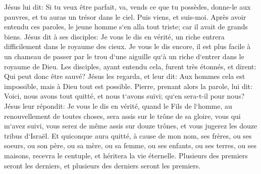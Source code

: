 \verse Jésus lui dit: Si tu veux être parfait, va, vends ce que tu possèdes, donne-le aux pauvres, et tu auras un trésor dans le ciel. Puis viens, et suis-moi. 
\verse Après avoir entendu ces paroles, le jeune homme s`en alla tout triste; car il avait de grands biens. 
\verse Jésus dit à ses disciples: Je vous le dis en vérité, un riche entrera difficilement dans le royaume des cieux. 
\verse Je vous le dis encore, il est plus facile à un chameau de passer par le trou d`une aiguille qu`à un riche d`entrer dans le royaume de Dieu. 
\verse Les disciples, ayant entendu cela, furent très étonnés, et dirent: Qui peut donc être sauvé? 
\verse Jésus les regarda, et leur dit: Aux hommes cela est impossible, mais à Dieu tout est possible. 
\verse Pierre, prenant alors la parole, lui dit: Voici, nous avons tout quitté, et nous t`avons suivi; qu`en sera-t-il pour nous? 
\verse Jésus leur répondit: Je vous le dis en vérité, quand le Fils de l`homme, au renouvellement de toutes choses, sera assis sur le trône de sa gloire, vous qui m`avez suivi, vous serez de même assis sur douze trônes, et vous jugerez les douze tribus d`Israël. 
\verse Et quiconque aura quitté, à cause de mon nom, ses frères, ou ses soeurs, ou son père, ou sa mère, ou sa femme, ou ses enfants, ou ses terres, ou ses maisons, recevra le centuple, et héritera la vie éternelle. 
\verse Plusieurs des premiers seront les derniers, et plusieurs des derniers seront les premiers. 


